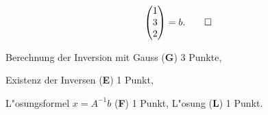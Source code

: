 \begin{loesung}
\begin{teilaufgaben}
\[\begin{pmatrix}
1\\3\\2
\end{pmatrix}=b.
\qedhere
\]
\end{teilaufgaben}
\end{loesung}

\begin{bewertung}
\begin{teilaufgaben}
\item
Berechnung der Inversion mit Gauss ({\bf G}) 3 Punkte,
\item
Existenz der Inversen ({\bf E}) 1 Punkt,
\item
L"osungsformel $x=A^{-1}b$ ({\bf F}) 1 Punkt,
L"osung ({\bf L}) 1 Punkt.
\end{teilaufgaben}
\end{bewertung}

